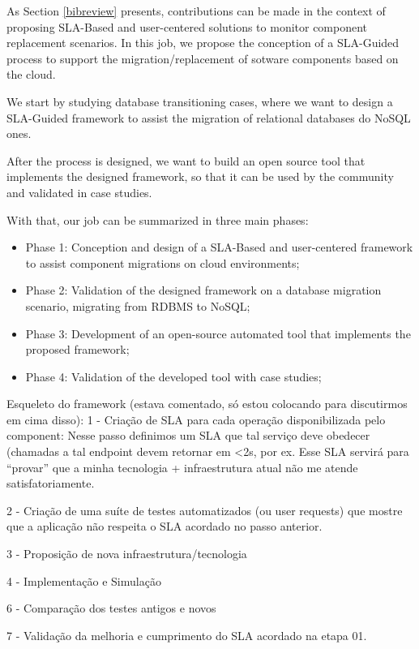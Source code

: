 \documentclass{article}
\begin{document}
As Section \ref{bibreview} presents, contributions can be made in the context of proposing SLA-Based and user-centered solutions to monitor component replacement scenarios. In this job, we propose the conception of a SLA-Guided process to support the migration/replacement of sotware components based on the cloud. 

We start by studying database transitioning cases, where we want to design a SLA-Guided framework to assist the migration of relational databases do NoSQL ones.

After the process is designed, we want to build an open source tool that implements the designed framework, so that it can be used by the community and validated in case studies. 

With that, our job can be summarized in three main phases:

\begin{itemize}
\item{Phase 1: Conception and design of a SLA-Based and user-centered framework to assist component migrations on cloud environments;}

\item{Phase 2: Validation of the designed framework on a database migration scenario, migrating from RDBMS to NoSQL;}

\item{Phase 3: Development of an open-source automated tool that implements the proposed framework;}

\item{Phase 4: Validation of the developed tool with case studies;}
\end{itemize}

Esqueleto do framework (estava comentado, só estou colocando para discutirmos em cima disso):
1 - Criação de SLA para cada operação disponibilizada pelo component: Nesse passo definimos um SLA que tal serviço deve obedecer (chamadas a tal endpoint devem retornar em <2s, por ex. Esse SLA servirá para “provar” que a minha tecnologia + infraestrutura atual não me atende satisfatoriamente.

2 - Criação de uma suíte de testes automatizados (ou user requests) que mostre que a aplicação não respeita o SLA acordado no passo anterior. 

3 - Proposição de nova infraestrutura/tecnologia

4 - Implementação e Simulação

6 - Comparação dos testes antigos e novos

7 - Validação da melhoria e cumprimento do SLA acordado na etapa 01.
\end{document}
